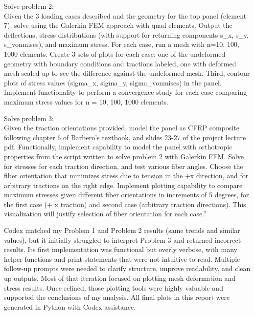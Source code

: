 \documentclass{article}
\begin{document}
\vspace{1em}
\noindent
Solve problem 2:\\
Given the 3 loading cases described and the geometry for the top panel (element 7), solve using the Galerkin FEM approach with quad elements. Output the deflections, stress distributions (with support for returning components s\_x, s\_y, s\_{vonmises}), and maximum stress. For each case, run a mesh with n=10, 100, 1000 elements. Create 3 sets of plots for each case: one of the undeformed geometry with boundary conditions and tractions labeled, one with deformed mesh scaled up to see the difference against the undeformed mesh. Third, contour plots of stress values (sigma\_x, sigma\_y, sigma\_{vonmises}) in the panel. Implement functionality to perform a convergence study for each case comparing maximum stress values for n = 10, 100, 1000 elements.

\vspace{1em}
\noindent
Solve problem 3:\\
Given the traction orientations provided, model the panel as CFRP composite following chapter 6 of Barbero's textbook, and slides 23-27 of the project lecture pdf. Functionally, implement capability to model the panel with orthotropic properties from the script written to solve problem 2 with Galerkin FEM. Solve for stresses for each traction direction, and test various fiber angles. Choose the fiber orientation that minimizes stress due to tension in the +x direction, and for arbitrary tractions on the right edge. Implement plotting capability to compare maximum stresses given different fiber orientations in increments of 5 degrees, for the first case (+ x traction) and second case (arbitrary traction directions). This visualization will justify selection of fiber orientation for each case.''

Codex matched my Problem 1 and Problem 2 results (same trends and similar values), but it initially struggled to interpret Problem 3 and returned incorrect results. Its first implementation was functional but overly verbose, with many helper functions and print statements that were not intuitive to read. Multiple follow-up prompts were needed to clarify structure, improve readability, and clean up outputs. Most of that iteration focused on plotting mesh deformation and stress results. Once refined, those plotting tools were highly valuable and supported the conclusions of my analysis. All final plots in this report were generated in Python with Codex assistance.
\end{document}
